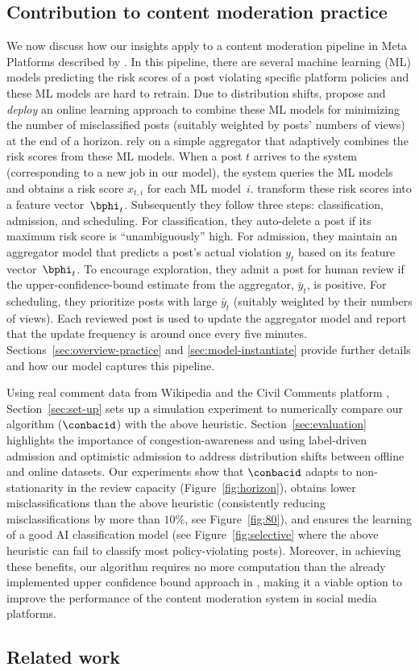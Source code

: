 \subsection{Contribution to content moderation practice}\label{sec:contri-content}
We now discuss how our insights apply to a content moderation pipeline in Meta Platforms described by \cite{Avadhanula2022}. In this pipeline, there are several machine learning (ML) models predicting the risk scores of a post violating specific platform policies and these ML models are hard to retrain. Due to distribution shifts, \cite{Avadhanula2022} propose and \emph{deploy} an online learning approach to combine these ML models for minimizing the number of misclassified posts (suitably weighted by posts' numbers of views) at the end of a horizon.
\cite{Avadhanula2022} rely on a simple aggregator that adaptively combines the risk scores from these ML models. When a post $t$ arrives to the system (corresponding to a new job in our model), the system queries the ML models and obtains a risk score $x_{t,i}$ for each ML model~$i$. \cite{Avadhanula2022} transform these risk scores into a feature vector~$\bphi_t$. Subsequently they follow three steps: classification, admission, and scheduling. For classification, they auto-delete a post if its maximum risk score is ``unambiguously'' high. For admission, they maintain an aggregator model that predicts a post's actual violation $y_t$ based on its feature vector~$\bphi_t$. To encourage exploration, they admit a post for human review if the upper-confidence-bound estimate from the aggregator, $\bar{y}_t$, is positive. For scheduling, they prioritize posts with large $\bar{y}_t$ (suitably weighted by their numbers of views). Each reviewed post is used to update the aggregator model and \cite{Avadhanula2022} report that the update frequency is around once every five minutes. Sections~\ref{sec:overview-practice} and \ref{sec:model-instantiate} provide further details and how our model captures this pipeline.

Using real comment data from Wikipedia \citep{dataset-wiki} and the Civil Comments platform \citep{dataset-civil}, Section~\ref{sec:set-up} sets up a simulation experiment to numerically compare our algorithm ($\conbacid$) with the above heuristic. Section~\ref{sec:evaluation} highlights the importance of congestion-awareness and using label-driven admission and optimistic admission to address distribution shifts between offline and online datasets. Our experiments show that $\conbacid$ adapts to non-stationarity in the review capacity (Figure~\ref{fig:horizon}), obtains lower misclassifications than the above heuristic (consistently reducing misclassifications by more than $10\%$, see Figure~\ref{fig:80}), and ensures the learning of a good AI classification model (see Figure~\ref{fig:selective} where the above heuristic can fail to classify most policy-violating posts). Moreover, in achieving these benefits, our algorithm requires no more computation than the already implemented upper confidence bound approach in \cite{Avadhanula2022}, making it a viable option to improve the performance of the content moderation system in social media platforms.


\subsection{Related work}\label{ssec:related_work}
